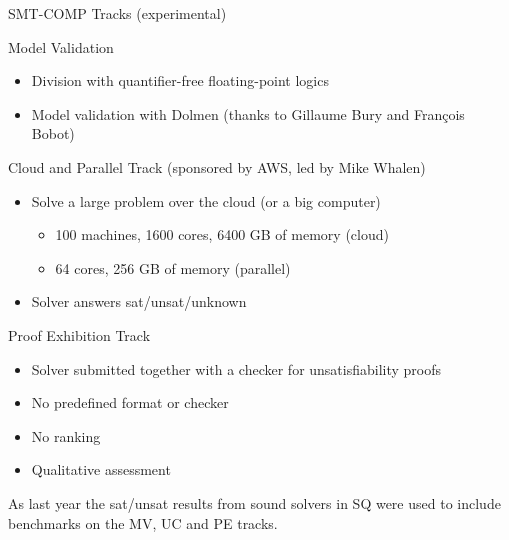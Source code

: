 \documentclass[table]{beamer}
\def\emph#1{\textcolor{MYblue}{#1}}
\begin{document}
\begin{frame}[fragile]{SMT-COMP Tracks (experimental)}

  \emph{Model Validation}
  \begin{itemize}
    \item Division with quantifier-free floating-point logics
    \item Model validation with Dolmen (thanks to Gillaume Bury and Fran\c{c}ois
    Bobot)
  \end{itemize}
  \bigskip

  \emph{Cloud and Parallel Track} (sponsored by AWS, led by Mike Whalen)
  \begin{itemize}
  \item Solve a large problem over the cloud (or a big computer)
  \begin{itemize}
    \item 100 machines, 1600 cores, 6400 GB of memory (cloud)
    \item 64 cores, 256 GB of memory (parallel)
  \end{itemize}
  \item Solver answers sat/unsat/unknown
  \end{itemize}

  \pause\bigskip

  \emph{Proof Exhibition Track}
  \begin{itemize}
  \item Solver submitted together with a checker for unsatisfiability proofs
  \item No predefined format or checker
  \item No ranking
  \item Qualitative assessment
\end{itemize}

\medskip
\pause
  \emph{As last year} the sat/unsat results from sound solvers in SQ were used to
  include benchmarks on the MV, UC and PE tracks.

\end{frame}
\end{document}
